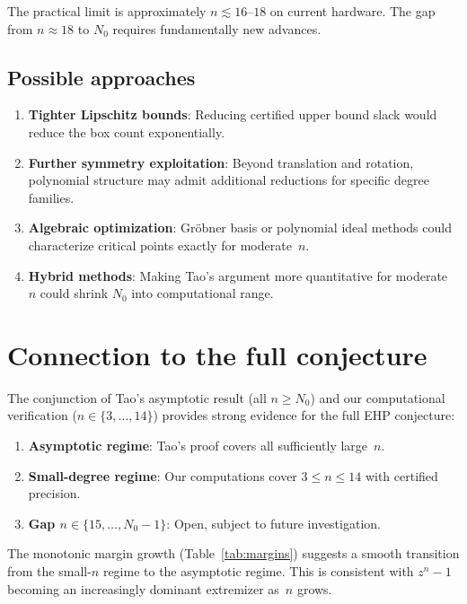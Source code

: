 \documentclass[11pt]{article}
\theoremstyle{plain}
\theoremstyle{definition}
\theoremstyle{remark}
\begin{document}
The practical limit is approximately $n \lesssim 16$--$18$ on current hardware. The gap from $n \approx 18$ to $N_0$ requires fundamentally new advances.

\subsection{Possible approaches}

\begin{enumerate}[nosep]
\item \textbf{Tighter Lipschitz bounds}: Reducing certified upper bound slack would reduce the box count exponentially.
\item \textbf{Further symmetry exploitation}: Beyond translation and rotation, polynomial structure may admit additional reductions for specific degree families.
\item \textbf{Algebraic optimization}: Gr\"obner basis or polynomial ideal methods could characterize critical points exactly for moderate~$n$.
\item \textbf{Hybrid methods}: Making Tao's argument more quantitative for moderate~$n$ could shrink $N_0$ into computational range.
\end{enumerate}

\section{Connection to the full conjecture}

The conjunction of Tao's asymptotic result (all $n \geq N_0$) and our computational verification ($n \in \{3, \ldots, 14\}$) provides strong evidence for the full EHP conjecture:

\begin{enumerate}[nosep]
\item \textbf{Asymptotic regime}: Tao's proof covers all sufficiently large~$n$.
\item \textbf{Small-degree regime}: Our computations cover $3 \leq n \leq 14$ with certified precision.
\item \textbf{Gap $n \in \{15, \ldots, N_0 - 1\}$}: Open, subject to future investigation.
\end{enumerate}

The monotonic margin growth (Table~\ref{tab:margins}) suggests a smooth transition from the small-$n$ regime to the asymptotic regime. This is consistent with $z^n - 1$ becoming an increasingly dominant extremizer as~$n$ grows.
\end{document}
